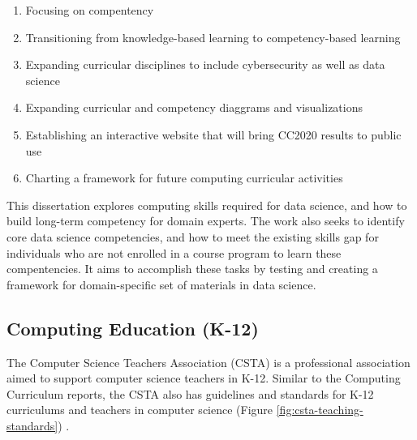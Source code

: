 \documentclass[010-intro.tex]{subfiles}
\begin{document}
    \begin{enumerate}
        \item Focusing on compentency
        \item Transitioning from knowledge-based learning to competency-based learning
        \item Expanding curricular disciplines to include cybersecurity as well as data science
        \item Expanding curricular and competency diaggrams and visualizations
        \item Establishing an interactive website that will bring CC2020 results to public use
        \item Charting a framework for future computing curricular activities
    \end{enumerate}

    This dissertation explores computing skills required for data science,
    and how to build long-term competency for domain experts.
    The work also seeks to identify core data science competencies,
    and how to meet the existing skills gap for individuals who are not enrolled
    in a course program to learn these compentencies.
    It aims to accomplish these tasks by
    testing and creating a framework for domain-specific set of materials in data science.

\subsection{Computing Education (K-12)}

    The Computer Science Teachers Association (CSTA)
    is a professional association aimed to support computer science teachers in K-12.
    Similar to the Computing Curriculum reports,
    the CSTA also has guidelines and standards for K-12 curriculums and teachers in computer science
    (Figure \ref{fig:csta-teaching-standards}) \cite{csta2017}.
\end{document}
